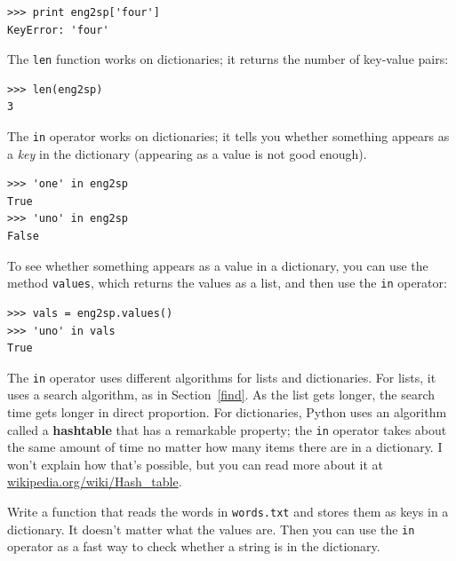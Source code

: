 \documentclass[10pt]{book}
\begin{document}

\beforeverb
\begin{verbatim}
>>> print eng2sp['four']
KeyError: 'four'
\end{verbatim}
\afterverb
%
The {\tt len} function works on dictionaries; it returns the
number of key-value pairs:


\beforeverb
\begin{verbatim}
>>> len(eng2sp)
3
\end{verbatim}
\afterverb
%
The {\tt in} operator works on dictionaries; it tells you whether
something appears as a {\em key} in the dictionary (appearing
as a value is not good enough).


\beforeverb
\begin{verbatim}
>>> 'one' in eng2sp
True
>>> 'uno' in eng2sp
False
\end{verbatim}
\afterverb
%
To see whether something appears as a value in a dictionary, you
can use the method {\tt values}, which returns the values as
a list, and then use the {\tt in} operator:


\beforeverb
\begin{verbatim}
>>> vals = eng2sp.values()
>>> 'uno' in vals
True
\end{verbatim}
\afterverb
%
The {\tt in} operator uses different algorithms for lists and
dictionaries.  For lists, it uses a search algorithm, as in
Section~\ref{find}.  As the list gets longer, the search time gets
longer in direct proportion.  For dictionaries, Python uses an
algorithm called a {\bf hashtable} that has a remarkable property; the
{\tt in} operator takes about the same amount of time no matter how
many items there are in a dictionary.  I won't explain how that's
possible, but you can read more about it at
\url{wikipedia.org/wiki/Hash_table}.


\begin{ex}
\label{wordlist2}


Write a function that reads the words in {\tt words.txt} and
stores them as keys in a dictionary.  It doesn't matter what the
values are.  Then you can use the {\tt in} operator
as a fast way to check whether a string is in
the dictionary.

\end{ex}
\end{document}
